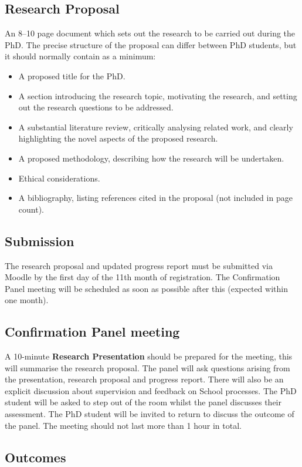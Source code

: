 \documentclass[12pt,a4paper]{article}
\begin{document}
\subsection{Research Proposal}
An 8--10 page document which sets out the research to be carried out during the PhD. The precise structure of the proposal can differ between PhD students, but it should normally contain as a minimum:
\begin{itemize}
	\item A proposed title for the PhD.
	\item A section introducing the research topic, motivating the research, and setting out the research questions to be addressed.
	\item A substantial literature review, critically analysing related work, and clearly highlighting the novel aspects of the proposed research.
	\item A proposed methodology, describing how the research will be undertaken.
	\item Ethical considerations.
	\item A bibliography, listing references cited in the proposal (not included in page count).
\end{itemize}

\subsection{Submission}
The research proposal and updated progress report must be submitted via Moodle by the first day of the 11th month of registration. The Confirmation Panel meeting will be scheduled as soon as possible after this (expected within one month).

\subsection{Confirmation Panel meeting}
A 10-minute \textbf{Research Presentation} should be prepared for the meeting, this will summarise the research proposal. The panel will ask questions arising from the presentation, research proposal and progress report. There will also be an explicit discussion about supervision and feedback on School processes. The PhD student will be asked to step out of the room whilst the panel discusses their assessment. The PhD student will be invited to return to discuss the outcome of the panel. The meeting should not last more than 1 hour in total.

\subsection{Outcomes}
\end{document}
